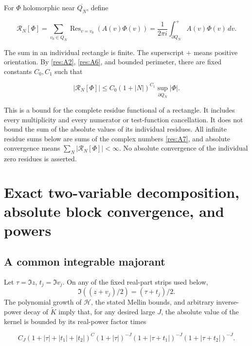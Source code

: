 \documentclass[11pt]{article}
\numberwithin{equation}{section}
\newcommand{\HH}{\mathcal H}
\begin{document}
For \(\Phi\) holomorphic near \(\overline{Q_N}\), define

\begin{equation}\label{res:A7}
\mathcal R_N[\Phi]
 =\sum_{v_0\in Q_N}\operatorname{Res}_{v=v_0}(A(v)\Phi(v))
 =\frac{1}{2\pi i}\int_{\partial Q_N}^{+}A(v)\Phi(v)\,dv.
\end{equation}

The sum in an individual rectangle is finite. The superscript \(+\)
means positive orientation. By \eqref{res:A2}, \eqref{res:A6}, and
bounded perimeter, there are fixed constants \(C_0,C_1\) such that

\begin{equation}\label{res:A8}
|\mathcal R_N[\Phi]|
 \leq C_0(1+|N|)^{C_1}
 \sup_{\partial Q_N}|\Phi|.
\end{equation}

This is a bound for the complete residue functional of a rectangle. It
includes every multiplicity and every numerator or test-function
cancellation. It does not bound the sum of the absolute values of its
individual residues. All infinite residue sums below are sums of the
complex numbers \eqref{res:A7}, and absolute convergence means
\(\sum_N|\mathcal R_N[\Phi]|<\infty\). No absolute convergence of the
individual zero residues is asserted.

\section{Exact two-variable decomposition, absolute block convergence,
and
powers}\label{exact-two-variable-decomposition-absolute-block-convergence-and-powers}

\subsection{A common integrable
majorant}\label{a-common-integrable-majorant}

Let \(\tau=\Im z\), \(t_j=\Im v_j\). On any of the fixed real-part
strips used below, \[
 \Im((z+v_j)/2)=(\tau+t_j)/2.
\] The polynomial growth of \(\HH\), the stated Mellin bounds, and
arbitrary inverse-power decay of \(\widetilde K\) imply that, for any
desired large \(J\), the absolute value of the kernel is bounded by its
real-power factor times

\begin{equation}\label{res:B1}
C_J(1+|\tau|+|t_1|+|t_2|)^C
 (1+|\tau|)^{-J}
 (1+|\tau+t_1|)^{-J}
 (1+|\tau+t_2|)^{-J}.
\end{equation}
\end{document}
